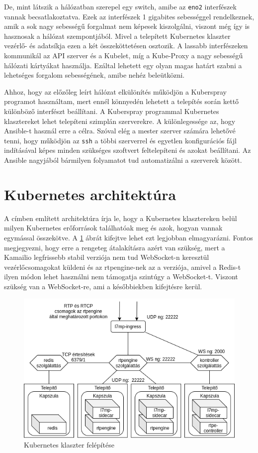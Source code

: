 De, mint látszik a hálózatban szerepel egy switch, amibe az \texttt{eno2} interfészek 
vannak becsatlakoztatva. Ezek az interfészek 1 gigabites sebességgel rendelkeznek, amik
a sok nagy sebességű forgalmat nem képesek kiszolgálni, viszont még így is hasznosak
a hálózat szempontjából. Mivel a telepített Kubernetes klaszter vezérlő- és adatsíkja
ezen a két összeköttetésen osztozik. A lassabb interfészeken kommunikál az
API szerver és a Kubelet, míg a Kube-Proxy a nagy sebességű hálózati kártyákat 
használja. Ezáltal lehetett egy olyan magas határt szabni a lehetséges forgalom
sebességének, amibe nehéz beleütközni. 

Ahhoz, hogy az előzőleg leírt hálózat elkülönítés működjön a Kuberspray programot 
használtam, mert ennél könnyedén lehetett a telepítés során kettő különböző interfészt
beállítani. A Kuberspray \cite{kubespray} programmal Kubernetes klasztereket lehet 
telepíteni szimplán szerverekre. A különlegessége az, hogy Ansible-t használ erre a 
célra. Szóval elég a mester szerver számára lehetővé tenni, hogy működjön az \texttt{ssh} 
a többi szerverrel és egyetlen konfigurációs fájl indításával képes minden szükséges 
szoftvert feltelepíteni és azokat beállítani. Az Ansible \cite{ansible} nagyjából 
bármilyen folyamatot tud automatizálni a szerverek között. 

\section{Kubernetes architektúra}

A címben említett architektúra írja le, hogy a Kubernetes klasztereken belül milyen 
Kubernetes erőforrások találhatóak meg és azok, hogyan vannak egymással összekötve. A 
\ref{fig:clusterSetup} ábrát kifejtve lehet ezt legjobban elmagyarázni. Fontos 
megjegyezni, hogy erre a rengeteg átalakításra azért van szükség, mert a Kamailio 
legfrissebb stabil verziója nem tud WebSocket-n keresztül vezérlőcsomagokat küldeni és az 
rtpengine-nek az a verziója, amivel a Redis-t ilyen módon lehet használni nem támogatja 
szintúgy a WebSocket-t. Viszont szükség van a WebSocket-re, ami a későbbiekben kifejtésre 
kerül.

\begin{figure}[!ht]
	\centering
	\includegraphics[width=1\textwidth, keepaspectratio]{figures/cluster.png}
	\caption{Kubernetes klaszter felépítése}
	\label{fig:clusterSetup}
\end{figure}

